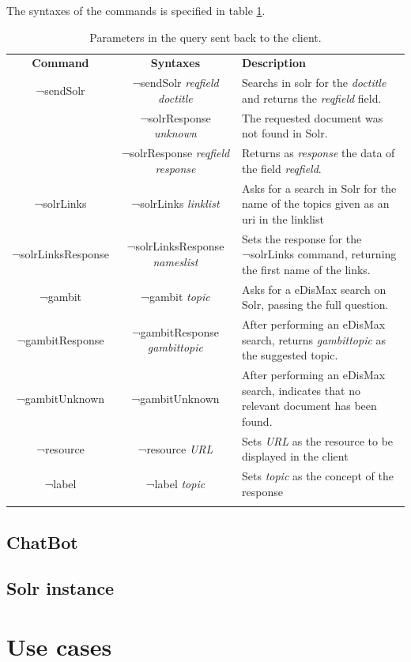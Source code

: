 The syntaxes of the commands is specified in table \ref{tab:oob-commands}.
\begin{center}
  \centering
  \begin{table}
    \begin{tabular*}{0.7\textwidth}{@{\extracolsep{\fill}} | c | c | p{} |}
      \hhline{|-|-|-|}
      \textbf{Command} & \textbf{Syntaxes} & \textbf{Description} \\ \hhline{|=|=|=|}
      ¬sendSolr & ¬sendSolr \textit{reqfield} \textit{doctitle} & Searchs in solr for the \textit{doctitle} and returns the \textit{reqfield} field.  \\ \hhline{|-|-|-|}
      \multirow{2}{*}{¬solrResponse} & ¬solrResponse \textit{unknown} & The requested document was not found in Solr. \\ \cline{2-3}
				     & ¬solrResponse \textit{reqfield} \textit{response} & Returns as \textit{response} the data of the field \textit{reqfield}. \\ \hhline{|-|-|-|}
      ¬solrLinks & ¬solrLinks \textit{linklist} & Asks for a search in Solr for the name of the topics given as an uri in the linklist \\ \hhline{|-|-|-|}
      ¬solrLinksResponse & ¬solrLinksResponse \textit{nameslist} & Sets the response for the ¬solrLinks command, returning the first name of the links. \\ \hhline{|-|-|-|}
      ¬gambit & ¬gambit \textit{topic}& Asks for a eDisMax search on Solr, passing the full question. \\ \hhline{|-|-|-|}
      ¬gambitResponse & ¬gambitResponse \textit{gambittopic} & After performing an eDisMax search, returns \textit{gambittopic} as the suggested topic. \\ \hhline{|-|-|-|}
      ¬gambitUnknown & ¬gambitUnknown & After performing an eDisMax search, indicates that no relevant document has been found. \\ \hhline{|-|-|-|}
      ¬resource & ¬resource \textit{URL} & Sets \textit{URL} as the resource to be displayed in the client \\ \hhline{|-|-|-|}
      ¬label & ¬label \textit{topic} & Sets \textit{topic} as the concept of the response \\ \hhline{|-|-|-|}
      \end{tabular*}
    \caption{Parameters in the query sent back to the client.}
    \label{tab:oob-commands}
  \end{table}
\end{center}

\subsection{ChatBot}
\label{sec:chatbot}


\subsection{Solr instance}
\label{sec:solr}


\section{Use cases}

